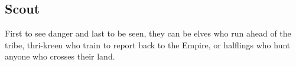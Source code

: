 

\subsection{Scout}
First to see danger and last to be seen, they can be elves who run ahead of the tribe, thri-kreen who train to report back to the Empire, or halflings who hunt anyone who crosses their land.

